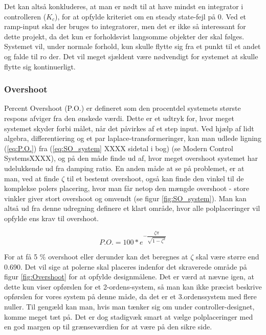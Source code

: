 Det kan altså konkluderes, at man er nødt til at have mindst en integrator i controlleren ($K_{c}$), for at opfylde kriteriet om en steady state-fejl på 0. Ved et ramp-input skal der bruges to integratorer, men det er ikke så interessant for dette projekt, da det kun er forholdsvist langsomme objekter der skal følges. Systemet vil, under normale forhold, kun skulle flytte sig fra et punkt til et andet og falde til ro der. Det vil meget sjældent være nødvendigt for systemet at skulle flytte sig kontinuerligt.

\subsubsection{Overshoot}

Percent Overshoot (P.O.) er defineret som den procentdel systemets største respons afviger fra den ønskede værdi. Dette er et udtryk for, hvor meget systemet skyder forbi målet, når det påvirkes af et step input. Ved hjælp af lidt algebra, differentiering og et par laplace-transformeringer, kan man udlede ligning (\ref{eq:P.O.}) fra (\ref{eq:SO_system} XXXX sidetal i bog) (se Modern Control Systems\cite{ModernControlSystem}XXXX), og på den måde finde ud af, hvor meget overshoot systemet har udelukkende ud fra damping ratio. En anden måde at se på problemet, er at man, ved at finde $\zeta$ til et bestemt overshoot, også kan finde den vinkel til de komplekse polers placering, hvor man får netop den mængde overshoot - store vinkler giver stort overshoot og omvendt (se figur \ref{fig:SO_system}). Man kan altså ud fra denne udregning definere et klart område, hvor alle polplaceringer vil opfylde ens krav til overshoot. 

\begin{equation}\label{eq:P.O.}
P.O.=100*e^{-\dfrac{\zeta\pi}{\sqrt{1-\zeta^2}}}
\end{equation}

For at få 5 $\%$ overshoot eller derunder kan det beregnes at $\zeta$ skal være større end 0.690. Det vil sige at polerne skal placeres indenfor det skraverede område på figur \ref{fig:Overshoot} for at opfylde designmålene. Det er værd at nævne igen, at dette kun viser opførslen for et 2-ordens-system, så man kan ikke præcist beskrive opførslen for vores system på denne måde, da det er et 3.ordenssystem med flere nuller. Til gengæld kan man, hvis man tænker sig om under controller-designet, komme meget tæt på. Det er dog stadigvæk smart at vælge polplaceringer med en god margen op til grænseværdien for at være på den sikre side.

